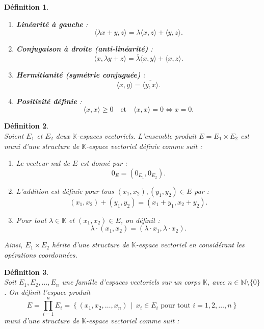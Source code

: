 \documentclass[a4paper, 14pt]{report}
\newtheorem{definition}{Définition}[section]
\begin{document}
\begin{onehalfspace}
{\begin{definition}
\begin{enumerate} [label=\roman*)]
	\item \textbf{Linéarité à gauche} :
	\[
	\langle \lambda x + y, z \rangle = \lambda \langle x, z \rangle + \langle y, z \rangle.
	\]
	
	\item \textbf{Conjugaison à droite (anti-linéarité)} :
	\[
	\langle x, \lambda y + z \rangle = \overline{\lambda} \langle x, y \rangle + \langle x, z \rangle.
	\]
	
	\item \textbf{Hermitianité (symétrie conjuguée)} :
	\[
	\langle x, y \rangle = \overline{\langle y, x \rangle}.
	\]
	
	\item \textbf{Positivité définie} :
	\[
	\langle x, x \rangle \geq 0 \quad \text{et} \quad \langle x, x \rangle = 0 \iff x = 0.
	\]
\end{enumerate}
\end{definition}

\begin{definition} \cite{axler2024linear}\\
Soient \( E_1 \) et \( E_2 \) deux \(\mathbb{K}\)-espaces vectoriels.  L'ensemble produit \( E = E_1 \times E_2 \) est muni d'une structure de \(\mathbb{K}\)-espace vectoriel définie comme suit :  
	\begin{enumerate}[label=\roman*)]
		\item   
		Le vecteur nul de \( E \) est donné par :  
		\[
		0_E = (0_{E_1}, 0_{E_2}).
		\]
		
		\item 
		L'addition est définie pour tous \( (x_1, x_2), (y_1, y_2) \in E \) par :  
		\[
		(x_1, x_2) + (y_1, y_2) = (x_1 + y_1, x_2 + y_2).
		\]
		
		\item   
		Pour tout \( \lambda \in \mathbb{K} \) et \( (x_1, x_2) \in E \), on définit :  
		\[
		\lambda \cdot (x_1, x_2) = (\lambda \cdot x_1, \lambda \cdot x_2).
		\]
	\end{enumerate}
Ainsi, \( E_1 \times E_2 \) hérite d'une structure de \( \mathbb{K} \)-espace vectoriel en considérant les opérations coordonnées.
\end{definition}

\begin{definition} \cite{axler2024linear}\\
Soit \( E_1, E_2, \dots, E_n \) une famille d'espaces vectoriels sur un corps \( \mathbb{K} \), avec \( n \in \mathbb{N} \setminus \{0\} \). On définit l’espace produit
	\[
	E = \prod_{i=1}^{n} E_i = \left\{ (x_1, x_2, \dots, x_n) \,\middle|\, x_i \in E_i \text{ pour tout } i = 1, 2, \dots, n \right\}
	\]
	muni d'une structure de \( \mathbb{K} \)-espace vectoriel comme suit :
	

\end{definition}}
\end{onehalfspace}
\end{document}
